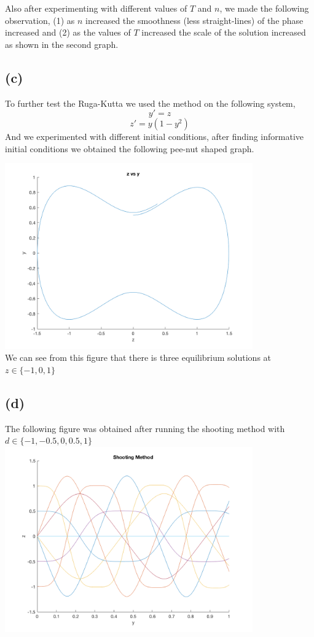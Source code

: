 \documentclass{article}
\begin{document}
Also after experimenting with different values of $T$ and $n$, we made the following observation, (1) as $n$ increased the smoothness (less straight-lines) of the phase increased and (2) as the values of $T$ increased the scale of the solution increased as shown in the second graph.

\subsection*{(c)}
To further test the Ruga-Kutta we used the method on the following system, 
$$ y' = z$$
$$ z' = y (1 - y^2)$$
And we experimented with different initial conditions, after finding informative initial conditions we obtained the following pee-nut shaped graph. 

\includegraphics[height=8cm]{partB_3}\\

We can see from this figure that there is three equilibrium solutions at $z \in \{ -1,0,1 \} $ 

\subsection*{(d)}
The following figure was obtained after running the shooting method with $d \in \{ -1, -0.5, 0, 0.5, 1 \} $\\

\includegraphics[height=8cm]{partB_4}\\
\end{document}
